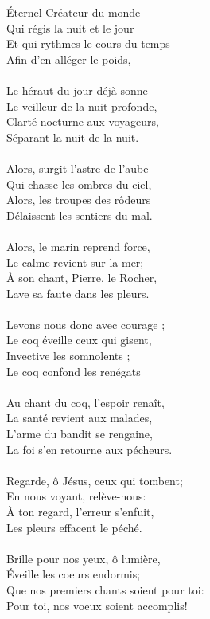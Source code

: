 Éternel Créateur du monde\\
Qui régis la nuit et le jour\\
Et qui rythmes le cours du temps\\
Afin d’en alléger le poids,\\
\\
Le héraut du jour déjà sonne\\
Le veilleur de la nuit profonde,\\
Clarté nocturne aux voyageurs,\\
Séparant la nuit de la nuit.\\
\\
Alors, surgit l’astre de l’aube\\
Qui chasse les ombres du ciel,\\
Alors, les troupes des rôdeurs\\
Délaissent les sentiers du mal.\\
\\
Alors, le marin reprend force,\\
Le calme revient sur la mer;\\
À son chant, Pierre, le Rocher,\\
Lave sa faute dans les pleurs.\\
\\
Levons nous donc avec courage ;\\
Le coq éveille ceux qui gisent,\\
Invective les somnolents ;\\
Le coq confond les renégats\\
\\
Au chant du coq, l’espoir renaît,\\
La santé revient aux malades,\\
L’arme du bandit se rengaine,\\
La foi s’en retourne aux pécheurs.\\
\\
Regarde, ô Jésus, ceux qui tombent;\\
En nous voyant, relève-nous:\\
À ton regard, l’erreur s’enfuit,\\
Les pleurs effacent le péché.\\
\\
Brille pour nos yeux, ô lumière,\\
Éveille les coeurs endormis;\\
Que nos premiers chants soient pour toi:\\
Pour toi, nos voeux soient accomplis!